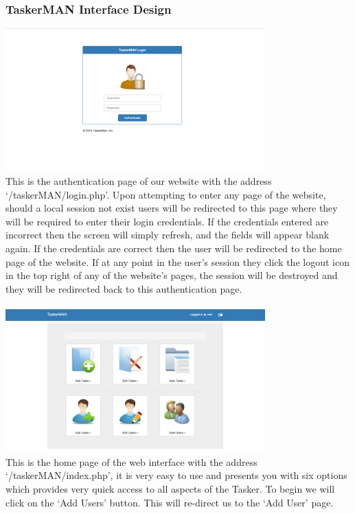 \documentclass{project}
\begin{document}
\subsubsection{TaskerMAN Interface Design} 
\includegraphics[width=0.75\textwidth, center]{images/5.2/TaskerMANAuthentication} \\
This is the authentication page of our website with the address `/taskerMAN/login.php'. Upon attempting to enter any page of the website, should a local session not exist users will be redirected to this page where they will be required to enter their login credentials. If the credentials entered are incorrect then the screen will simply refresh, and the fields will appear blank again. If the credentials are correct then the user will be redirected to the home page of the website. If at any point in the user's session they click the logout icon in the top right of any of the website's pages, the session will be destroyed and they will be redirected back to this authentication page.\\~\\
\newline
\includegraphics[width=0.75\textwidth, center]{images/5.2/TaskerMANHomePage} \\
This is the home page of the web interface with the address `/taskerMAN/index.php', it is very easy to use and presents you with six options which provides very quick access to all aspects of the Tasker. To begin we will click on the `Add Users' button. This will re-direct us to the `Add User' page. \\~\\
\end{document}
